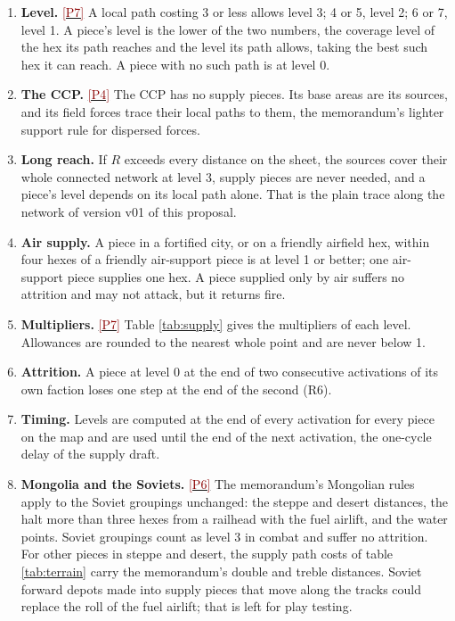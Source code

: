 \documentclass[11pt]{article}
\newcommand{\ptest}[1]{\hyperlink{ptest}{\textcolor{darkred}{[P#1]}}}
\begin{document}
\begin{enumerate}
\item \textbf{Level.} \ptest{7} A local path costing 3 or less allows level 3; 4 or 5, level 2; 6 or 7, level 1. A piece's level is the lower of the two numbers, the coverage level of the hex its path reaches and the level its path allows, taking the best such hex it can reach. A piece with no such path is at level 0.
\item \textbf{The CCP.} \ptest{4} The CCP has no supply pieces. Its base areas are its sources, and its field forces trace their local paths to them, the memorandum's lighter support rule for dispersed forces.
\item \textbf{Long reach.} If $R$ exceeds every distance on the sheet, the sources cover their whole connected network at level 3, supply pieces are never needed, and a piece's level depends on its local path alone. That is the plain trace along the network of version v01 of this proposal.
\item \textbf{Air supply.} A piece in a fortified city, or on a friendly airfield hex, within four hexes of a friendly air-support piece is at level 1 or better; one air-support piece supplies one hex. A piece supplied only by air suffers no attrition and may not attack, but it returns fire.
\item \textbf{Multipliers.} \ptest{7} Table \ref{tab:supply} gives the multipliers of each level. Allowances are rounded to the nearest whole point and are never below 1.
\item \textbf{Attrition.} A piece at level 0 at the end of two consecutive activations of its own faction loses one step at the end of the second (R6).
\item \textbf{Timing.} Levels are computed at the end of every activation for every piece on the map and are used until the end of the next activation, the one-cycle delay of the supply draft.
\item \textbf{Mongolia and the Soviets.} \ptest{6} The memorandum's Mongolian rules apply to the Soviet groupings unchanged: the steppe and desert distances, the halt more than three hexes from a railhead with the fuel airlift, and the water points. Soviet groupings count as level 3 in combat and suffer no attrition. For other pieces in steppe and desert, the supply path costs of table \ref{tab:terrain} carry the memorandum's double and treble distances. Soviet forward depots made into supply pieces that move along the tracks could replace the roll of the fuel airlift; that is left for play testing.
\end{enumerate}
\end{document}
